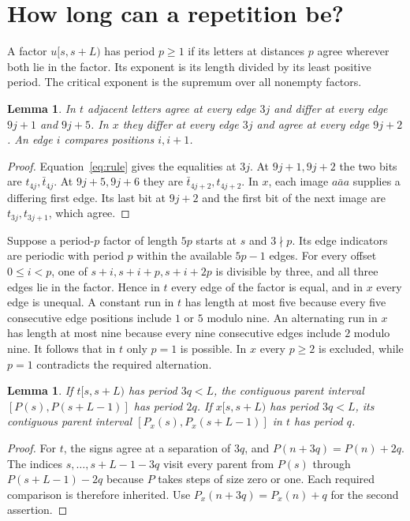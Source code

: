 \documentclass[11pt]{article}
\newtheorem{lemma}[theorem]{Lemma}
\begin{document}
\section{How long can a repetition be?}
A factor $u[s,s+L)$ has period $p\ge1$ if its letters at distances $p$ agree wherever
both lie in the factor. Its exponent is its length divided by its least positive period.
The critical exponent is the supremum over all nonempty factors.

\begin{lemma}\label{edges}
In $t$ adjacent letters agree at every edge $3j$ and differ at every edge
$9j+1$ and $9j+5$. In $x$ they differ at every edge $3j$ and agree at every
edge $9j+2$. An edge $i$ compares positions $i,i+1$.
\end{lemma}
\begin{proof}
Equation~\eqref{eq:rule} gives the equalities at $3j$. At $9j+1,9j+2$ the two bits
are $t_{4j},\bar t_{4j}$. At $9j+5,9j+6$ they are $\bar t_{4j+2},t_{4j+2}$.
In $x$, each image $a\bar a a$ supplies a differing first edge. Its last bit at $9j+2$
and the first bit of the next image are $t_{3j},t_{3j+1}$, which agree.
\end{proof}

Suppose a period-$p$ factor of length $5p$ starts at $s$ and $3\nmid p$. Its edge
indicators are periodic with period $p$ within the available $5p-1$ edges. For every
offset $0\le i<p$, one of $s+i,s+i+p,s+i+2p$ is divisible by three, and all three
edges lie in the factor. Hence in $t$ every edge of the factor is equal, and in $x$
every edge is unequal. A constant run in $t$ has length at most five because every five
consecutive edge positions include $1$ or $5$ modulo nine. An alternating run in $x$
has length at most nine because every nine consecutive edges include $2$ modulo nine.
It follows that in $t$ only $p=1$ is possible. In $x$ every $p\ge2$ is excluded, while
$p=1$ contradicts the required alternation.

\begin{lemma}\label{pull}
If $t[s,s+L)$ has period $3q<L$, the contiguous parent interval
$[P(s),P(s+L-1)]$ has period $2q$. If $x[s,s+L)$ has period $3q<L$, its contiguous
parent interval $[P_x(s),P_x(s+L-1)]$ in $t$ has period $q$.
\end{lemma}
\begin{proof}
For $t$, the signs agree at a separation of $3q$, and $P(n+3q)=P(n)+2q$.
The indices $s,\ldots,s+L-1-3q$ visit every parent from $P(s)$ through
$P(s+L-1)-2q$ because $P$ takes steps of size zero or one. Each required comparison
is therefore inherited. Use $P_x(n+3q)=P_x(n)+q$ for the second assertion.
\end{proof}
\end{document}
